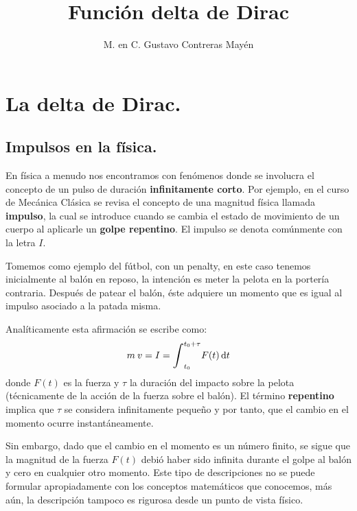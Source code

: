 \documentclass[12pt]{article}
\title{Función delta de Dirac}
\author{M. en C. Gustavo Contreras Mayén}
\date{ }
\def\scaleint#1{\vcenter{\hbox{\scaleto[3ex]{\displaystyle\int}{#1}}}}
\numberwithin{equation}{section}
\begin{document}
\maketitle
\fontsize{14}{14}\selectfont
{}
\tableofcontents
\newpage

\section{La delta de Dirac.}
\subsection{Impulsos en la física.}

En física a menudo nos encontramos con fenómenos donde se involucra el concepto de un pulso de duración \textbf{infinitamente corto}. Por ejemplo, en el curso de Mecánica Clásica se revisa el concepto de una magnitud física llamada \textbf{impulso}, la cual se introduce cuando se cambia el estado de movimiento de un cuerpo al aplicarle un \textbf{golpe repentino}. El impulso se denota comúnmente con la letra $I$.
\par
Tomemos como ejemplo del fútbol, con un penalty,  en este caso tenemos inicialmente al balón en reposo, la intención es meter la pelota en la portería contraria. Después de patear el balón, éste adquiere un momento que es igual al impulso asociado a la patada misma.
\par
Analíticamente esta afirmación se escribe como:
\begin{align*}
m \: v = I = \scaleint{6ex}_{t_{0}}^{t_{0} + \tau} F (t) \dd{t}
\end{align*}
donde $F (t)$ es la fuerza y $\tau$ la duración del impacto sobre la pelota (técnicamente de la acción de la fuerza sobre el balón). El término \textbf{repentino} implica que $\tau$ se considera infinitamente pequeño y por tanto, que el cambio en el momento ocurre instantáneamente.
\par
Sin embargo, dado que el cambio en el momento es un número finito, se sigue que la magnitud de la fuerza $F (t)$ debió haber sido infinita durante el golpe al balón y cero en cualquier otro momento. Este tipo de descripciones no se puede formular apropiadamente con los conceptos matemáticos que conocemos, más aún, la descripción tampoco es rigurosa desde un punto de vista físico.
\end{document}
